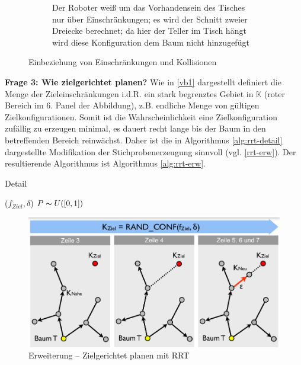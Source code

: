 \begin{figure}[h!]
\begin{subfigure}{.5\textwidth}
		\caption{Der Roboter \glqq weiß\grqq{} um das Vorhandensein des Tisches nur über Einschränkungen; es wird der Schnitt zweier Dreiecke berechnet; da hier der Teller im Tisch hängt wird diese Konfiguration dem Baum nicht hinzugefügt}
	\end{subfigure}
	\caption{Einbeziehung von Einschränkungen und Kollisionen}
	\label{fig:einschr}
\end{figure}
\textbf{Frage 3: Wie zielgerichtet planen?}
Wie in \autoref{vb1} dargestellt definiert die Menge der Zieleinschränkungen i.d.R. ein stark begrenztes Gebiet in $\mathbb{K}$ (roter Bereich im 6. Panel der Abbildung), z.B. endliche Menge von gültigen Zielkonfigurationen. Somit ist die Wahrscheinlichkeit eine Zielkonfiguration zufällig zu erzeugen minimal, es dauert recht lange bis der Baum in den betreffenden Bereich reinwächst.
Daher ist die in Algorithmus \autoref{alg:rrt-detail} dargestellte Modifikation der Stichprobenerzeugung sinnvoll (vgl. \autoref{rrt-erw}). Der resultierende Algorithmus ist Algorithmus \ref{alg:rrt-erw}.\\
\begin{algorithm}
  \caption{Detail
    \label{alg:rrt-detail}}
  \begin{algorithmic}[1]
    ($f_{Ziel}, \delta$) 
      \State $P \thicksim U(\left[0,1\right])$
      	\State {}
      \Else
      	\State {}
      \EndIf
  \end{algorithmic}
\end{algorithm}
\begin{figure}[h!]
	\centering
	\includegraphics[width=.5\textwidth]{figures/ch04_rrt-erw.png}
	\caption{Erweiterung -- Zielgerichtet planen mit RRT}
	\label{rrt-erw}
\end{figure}
